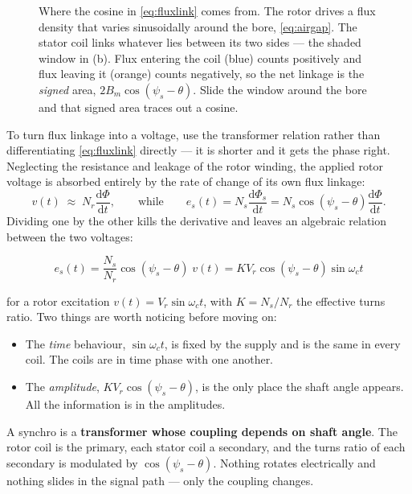 \documentclass[11pt,a4paper]{article}
\begin{document}
\begin{figure}[H]
\caption{Where the cosine in \eqref{eq:fluxlink} comes from. The rotor drives
a flux density that varies sinusoidally around the bore, \eqref{eq:airgap}.
The stator coil links whatever lies between its two sides --- the shaded
window in (b). Flux entering the coil (blue) counts positively and flux
leaving it (orange) counts negatively, so the net linkage is the
\emph{signed} area, $2B_{m}\cos(\psi_{s}-\theta)$. Slide the window around
the bore and that signed area traces out a cosine.}
\label{fig:cosine}
\end{figure}

To turn flux linkage into a voltage, use the transformer relation rather than
differentiating \eqref{eq:fluxlink} directly --- it is shorter and it gets the
phase right. Neglecting the resistance and leakage of the rotor winding, the
applied rotor voltage is absorbed entirely by the rate of change of its own
flux linkage:
\[
  v(t)\;\approx\;N_{r}\frac{\mathrm{d}\Phi}{\mathrm{d}t},
  \qquad\text{while}\qquad
  e_{s}(t)=N_{s}\frac{\mathrm{d}\Phi_{s}}{\mathrm{d}t}
          =N_{s}\cos(\psi_{s}-\theta)\frac{\mathrm{d}\Phi}{\mathrm{d}t}.
\]
Dividing one by the other kills the derivative and leaves an algebraic
relation between the two voltages:

\begin{equation}
  \boxed{\;e_{s}(t)=\frac{N_{s}}{N_{r}}\cos(\psi_{s}-\theta)\;v(t)
        =K V_{r}\cos(\psi_{s}-\theta)\sin\omega_{c}t\;}
  \label{eq:onecoil}
\end{equation}

for a rotor excitation $v(t)=V_{r}\sin\omega_{c}t$, with $K=N_{s}/N_{r}$ the
effective turns ratio. Two things are worth noticing before moving on:

\begin{itemize}[leftmargin=1.5em,itemsep=1pt]
\item The \emph{time} behaviour, $\sin\omega_{c}t$, is fixed by the supply and
      is the same in every coil. The coils are in time phase with one another.
\item The \emph{amplitude}, $KV_{r}\cos(\psi_{s}-\theta)$, is the only place
      the shaft angle appears. All the information is in the amplitudes.
\end{itemize}

\begin{keyidea}
A synchro is a \textbf{transformer whose coupling depends on shaft angle}. The
rotor coil is the primary, each stator coil a secondary, and the turns ratio
of each secondary is modulated by $\cos(\psi_{s}-\theta)$. Nothing rotates
electrically and nothing slides in the signal path --- only the coupling
changes.
\end{keyidea}
\end{document}
